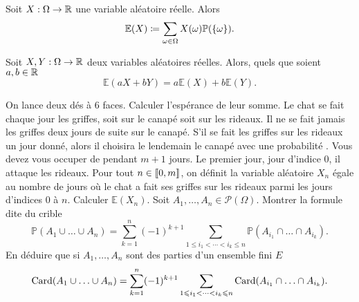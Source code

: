 \documentclass{magnolia}
\begin{document}
\begin{proposition}
Soit $X:\Omega\to\mathbb{R}$ une variable aléatoire réelle. Alors
\[\mathbb{E}(X)\coloneqq\sum_{\omega\in\Omega} X(\omega) \mathbb{P}(\left\{\omega\right\}).\]
\end{proposition}


\begin{proposition}
Soit $X,Y:\Omega\to\mathbb{R}$ deux variables aléatoires réelles. Alors, quels que soient
$a,b\in\mathbb{R}$
\[\mathbb{E}(aX+bY)=a\mathbb{E}(X)+b\mathbb{E}(Y).\]
\end{proposition}

\begin{exos}
\exo On lance deux dés à 6 faces. Calculer l'espérance de leur somme.
\exo Le chat  se fait chaque jour les griffes, soit sur le canapé soit sur les
  rideaux. Il ne se fait jamais les griffes deux jours de suite sur le canapé. S'il se fait les
  griffes sur les rideaux un jour donné, alors il choisira le lendemain le canapé avec une
  probabilité . Vous devez vous occuper de  pendant $m+1$ jours.
  Le premier jour, jour d'indice 0, il attaque les rideaux. Pour tout $n\in\left\llbracket 0,m\right\rrbracket$, on
  définit la variable aléatoire $X_{n}$ égale au nombre de jours où le chat a fait ses griffes
  sur les rideaux parmi les jours d'indices 0 à $n$. Calculer $\mathbb{E}(X_n)$.
\exo Soit $A_1,\ldots,A_n\in\mathcal{P}(\Omega)$. Montrer la formule dite du crible
  \[\mathbb{P}(A_1\cup\ldots\cup A_n)=\sum_{k=1}^n
    (-1)^{k+1}\sum_{1\leq i_1<\cdots<i_k\leq n}
    \mathbb{P}(A_{i_1}\cap\ldots\cap A_{i_k}).\]
  En déduire que si $A_1,\ldots,A_n$ sont des parties d'un ensemble fini $E$
  \[\operatorname{Card}(A_1\cup\ldots\cup A_n)=\sum_{k=1}^n
    (-1)^{k+1}\sum_{1\leqslant i_1<\cdots<i_k\leqslant n}
    \operatorname{Card}(A_{i_1}\cap\ldots\cap A_{i_k}).\] 
\end{exos}
\end{document}
